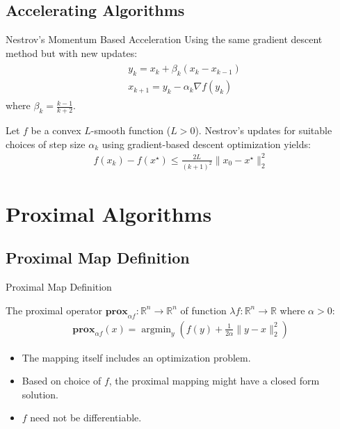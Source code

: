 \documentclass{beamer}
\DeclareMathOperator*{\argmin}{argmin}
\begin{document}
\subsection{Accelerating Algorithms}
\begin{frame}{Nestrov's Momentum Based Acceleration}
Using the same gradient descent method but with new updates:
\begin{eqnarray*}
\begin{aligned}
    &y_k = x_k+ \beta_k(x_k-x_{k-1})\\
    &x_{k+1}=y_k-\alpha_k\nabla f(y_k)
    \end{aligned}
\end{eqnarray*}
where $\beta_k=\frac{k-1}{k+2}$.
\pause
\begin{theorem}
Let $f$ be a convex $L$-smooth function ($L>0$). Nestrov's updates for suitable choices of step size $\alpha_k$ using gradient-based descent optimization yields:
    \begin{align*}
        f(x_k)-f(x^\star)\leq\frac{2L}{(k+1)^2}\|x_0-x^\star\|_2^2
    \end{align*}
\end{theorem}
\end{frame}

\section{Proximal Algorithms}

\subsection{Proximal Map Definition}
\begin{frame}{Proximal Map Definition}
\begin{definition}
    The proximal operator $\mathbf{prox}_{\alpha f}:\mathbb{R}^n\rightarrow\mathbb{R}^n$ of function $\lambda f:\mathbb{R}^n\rightarrow \mathbb{R}$ where $\alpha>0$:
    \begin{align*}
        \mathbf{prox}_{\alpha f}(x)=\argmin_{y}\left(f(y)+\frac{1}{2\alpha}\|y-x\|_2^2\right)
    \end{align*}
\end{definition}
\pause
\begin{itemize}
    \item The mapping itself includes an optimization problem.
    \pause
    \item Based on choice of $f$, the proximal mapping might have a closed form solution.
    \pause
    \item $f$ need not be differentiable.
\end{itemize}
\end{frame}
\end{document}
